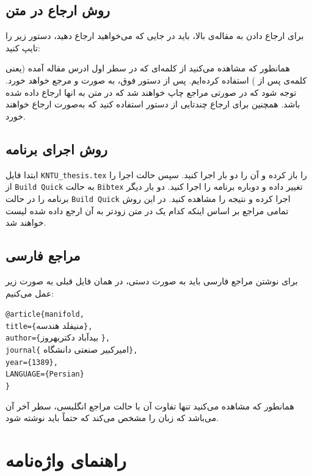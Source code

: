 \subsection{روش ارجاع در متن}
برای ارجاع دادن به مقاله‌ی بالا، باید در جایی که می‌خواهید ارجاع دهید، دستور زیر را تایپ کنید:
\begin{latin}
\end{latin}
همانطور که مشاهده می‌کنید از کلمه‌ای که در سطر اول ادرس مقاله آمده (یعنی کلمه‌ی پس از
)
استفاده کرده‌ایم. پس از دستور فوق، به صورت \cite{bidabad2007classification} و \cite{aa} مرجع خواهد خورد. توجه شود که در صورتی مراجع چاپ خواهند شد که در متن به انها ارجاع داده شده باشد. همچنین برای ارجاع چندتایی از دستور 
استفاده کنید که به‌صورت \cite{taghirad, zakeri, ahmadi} ارجاع خواهند خورد.
\subsection{روش اجرای برنامه}
ابتدا فایل
\verb;KNTU_thesis.tex;
را باز کرده و آن را دو بار اجرا کنید. سپس حالت اجرا را از 
\verb;Build Quick;
به حالت
\verb;Bibtex;
تغییر داده و دوباره برنامه را اجرا کنید. دو بار دیگر برنامه را در حالت 
\verb;Build Quick;
اجرا کرده و نتیجه را مشاهده کنید. در این روش تمامی مراجع بر اساس اینکه کدام یک در متن زودتر به آن ارجع داده شده لیست خواهند شد.
\subsection{مراجع فارسی}
برای نوشتن مراجع فارسی باید به صورت دستی، در همان فایل قبلی به صورت زیر عمل می‌کنیم:
\begin{LTR}
\noindent\verb;@article{manifold,;\\
\verb;title={;منیفلد هندسه\verb;},;\\
\verb;author={;بیدآباد دکتربهروز \verb;},;\\
\verb;journal{; امیرکبیر صنعتی دانشگاه\verb;},;\\
\verb;year={1389},;\\
\verb;LANGUAGE={Persian};\\
\verb;};
\end{LTR}
همانطور که مشاهده می‌کنید تنها تفاوت آن با حالت مراجع انگلیسی، سطر آخر آن می‌باشد که زبان را مشخص می‌کند که حتماً باید نوشته شود.
\section{راهنمای واژه‌نامه}

